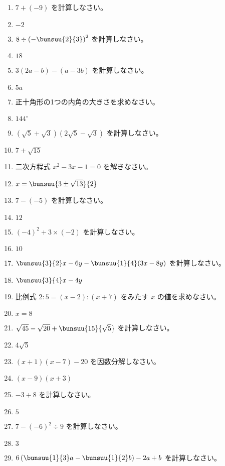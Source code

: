 \documentclass[uplatex,a4j,11pt]{jsreport}
\begin{document}
\begin{multicols}{2}
\begin{enumerate}
    \item $7+(-9)$ を計算しなさい。%
    \item $-2$
    \item $8\div \left(-\bunsuu{2}{3}\right)^2$ を計算しなさい。%
    \item $18$
    \item $3(2a-b)-(a-3b)$ を計算しなさい。%
    \item $5a$
    \item 正十角形の1つの内角の大きさを求めなさい。%
    \item $144^\circ$
    \item $(\sqrt{5}+\sqrt{3})(2\sqrt{5}-\sqrt{3})$ を計算しなさい。%
    \item $7+\sqrt{15}$
    \item 二次方程式 $x^2-3x-1=0$ を解きなさい。%
    \item $x=\bunsuu{3\pm\sqrt{13}}{2}$
    \item $7-(-5)$ を計算しなさい。%
    \item $12$
    \item $(-4)^2+3\times (-2)$ を計算しなさい。%
    \item $10$
    \item $\bunsuu{3}{2}x-6y-\bunsuu{1}{4}(3x-8y)$ を計算しなさい。%
    \item $\bunsuu{3}{4}x-4y$
    \item 比例式 $2:5=(x-2):(x+7)$ をみたす $x$ の値を求めなさい。%
    \item $x=8$
    \item $\sqrt{45}-\sqrt{20}+\bunsuu{15}{\sqrt{5}}$ を計算しなさい。%
    \item $4\sqrt{5}$
    \item $(x+1)(x-7)-20$ を因数分解しなさい。%
    \item $(x-9)(x+3)$
    \item $-3+8$ を計算しなさい。%
    \item $5$
    \item $7-(-6)^2\div 9$ を計算しなさい。%
    \item $3$
    \item $6\left(\bunsuu{1}{3}a-\bunsuu{1}{2}b\right)-2a+b$ を計算しなさい。%

\end{enumerate}
\end{multicols}
\end{document}
